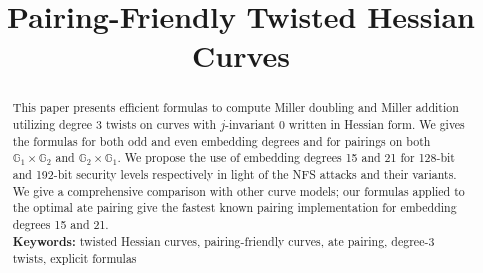 \documentclass[11pt,runningheads]{llncs}
\theoremstyle{definition}
\newif\ifpublic
\begin{document}
\title{Pairing-Friendly Twisted Hessian Curves}


\ifpublic
\author{
Chitchanok Chuengsatiansup\inst{1}
\and
Chloe Martindale\inst{2}
}
\authorrunning{Chuengsatiansup, Martindale}

\institute{
INRIA and ENS de Lyon\\
46 All\'{e}e d'Italie 69364 Lyon Cedex 07, France \\
\email{chitchanok.chuengsatiansup@ens-lyon.fr}
\and
Department of Mathematics and Computer Science\\
Technische Universiteit Eindhoven\\
P.O. Box 513, 5600 MB Eindhoven, The Netherlands\\
\email{c.r.martindale@tue.nl}
}
\fi


\date{}
\maketitle
\begin{abstract}
This paper presents efficient formulas to compute Miller doubling and Miller addition utilizing degree 3 twists on curves with $j$-invariant 0 written in Hessian form. 
We gives the formulas for both odd and even embedding degrees and for pairings on both $\mathbb{G}_1 \times \mathbb{G}_2$ and $\mathbb{G}_{2} \times \mathbb{G}_{1}$.
We propose the use of embedding degrees 15 and 21 for 128-bit and 192-bit security levels respectively in light of the NFS attacks and their variants.
We give a comprehensive comparison with other curve models; our formulas 
applied to the optimal ate pairing give the fastest known pairing implementation
for embedding degrees 15 and 21.
\\[10pt]
\textbf{Keywords:}
twisted Hessian curves, pairing-friendly curves, ate pairing, degree-3 twists, explicit formulas
\end{abstract}

\ifpublic
\begingroup
\makeatletter
\def\@thefnmark{} \@footnotetext{\relax
Chitchanok Chuengsatiansup acknowledges the support of Bpifrance
in the context of the national projet RISQ (P141580).
Chloe Martindale was supported by the Commission
of the European Communities through the Horizon 2020 program under
CHIST-ERA USEIT (NWO project 651.002.004).
}
\endgroup
\fi






%



%
%
%


%






%
%
%
\end{document}
